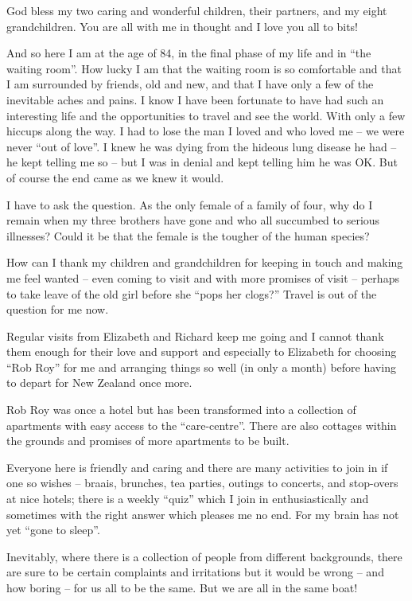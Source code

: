God bless my two caring and wonderful children, their partners, and my
eight grandchildren. You are all with me in thought and I love you all
to bits!

And so here I am at the age of 84, in the final phase of my life and
in ``the waiting room''. How lucky I am that the waiting room is so
comfortable and that I am surrounded by friends, old and new, and that
I have only a few of the inevitable aches and pains. I know I have
been fortunate to have had such an interesting life and the
opportunities to travel and see the world. With only a few hiccups
along the way. I had to lose the man I loved and who loved me -- we
were never ``out of love''. I knew he was dying from the hideous lung
disease he had -- he kept telling me so -- but I was in denial and
kept telling him he was OK. But of course the end came as we knew it
would.

I have to ask the question. As the only female of a family of four,
why do I remain when my three brothers have gone and who all succumbed
to serious illnesses? Could it be that the female is the tougher of
the human species?

How can I thank my children and grandchildren for keeping in touch and
making me feel wanted -- even coming to visit and with more promises
of visit -- perhaps to take leave of the old girl before she ``pops
her clogs?'' Travel is out of the question for me now.

Regular visits from Elizabeth and Richard keep me going and I cannot
thank them enough for their love and support and especially to
Elizabeth for choosing ``Rob Roy'' for me and arranging things so well
(in only a month) before having to depart for New Zealand once more.

Rob Roy was once a hotel but has been transformed into a collection of
apartments with easy access to the ``care-centre''. There are also
cottages within the grounds and promises of more apartments to be
built.

Everyone here is friendly and caring and there are many activities to
join in if one so wishes -- braais, brunches, tea parties, outings to
concerts, and stop-overs at nice hotels; there is a weekly ``quiz''
which I join in enthusiastically and sometimes with the right answer
which pleases me no end. For my brain has not yet ``gone to sleep''.

Inevitably, where there is a collection of people from different
backgrounds, there are sure to be certain complaints and irritations
but it would be wrong -- and how boring -- for us all to be the
same. But we are all in the same boat!

